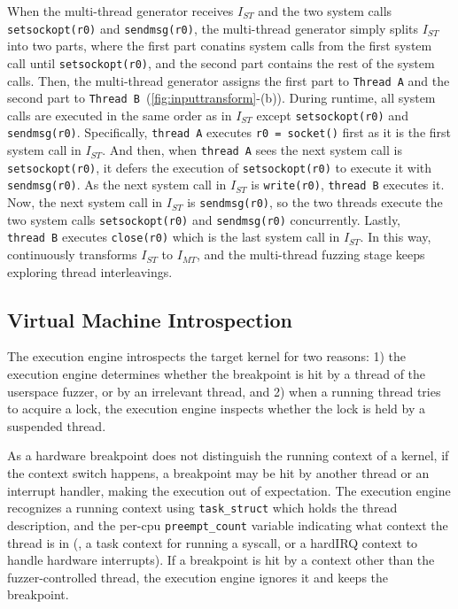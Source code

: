 When the multi-thread generator receives $I_{ST}$ and the two system
calls \texttt{setsockopt(r0)} and \texttt{sendmsg(r0)}, the
multi-thread generator simply splits $I_{ST}$ into two parts, where
the first part conatins system calls from the first system call until
\texttt{setsockopt(r0)}, and the second part contains the rest of the
system calls. Then, the multi-thread generator assigns the first part
to \texttt{Thread~A} and the second part to
\texttt{Thread~B}~(\autoref{fig:inputtransform}-(b)).
%
During runtime, all system calls are executed in the same order as in
$I_{ST}$ except \texttt{setsockopt(r0)} and \texttt{sendmsg(r0)}.
%
Specifically, \texttt{thread~A} executes \texttt{r0 = socket()} first
as it is the first system call in $I_{ST}$. And then, when
\texttt{thread~A} sees the next system call is
\texttt{setsockopt(r0)}, it defers the execution of
\texttt{setsockopt(r0)} to execute it with \texttt{sendmsg(r0)}.
%
As the next system call in $I_{ST}$ is \texttt{write(r0)},
\texttt{thread~B} executes it. Now, the next system call in $I_{ST}$
is \texttt{sendmsg(r0)}, so the two threads execute the two system
calls \texttt{setsockopt(r0)} and \texttt{sendmsg(r0)} concurrently.
%
Lastly, \texttt{thread~B} executes \texttt{close(r0)} which is the
last system call in $I_{ST}$.
%
In this way, \sys continuously transforms $I_{ST}$ to $I_{MT}$, and
the multi-thread fuzzing stage keeps exploring thread interleavings.

\subsection{Virtual Machine Introspection}
\label{s:appendix:vmi}

The execution engine introspects the target kernel for two reasons: 1)
the execution engine determines whether the breakpoint is hit by a
thread of the userspace fuzzer, or by an irrelevant thread, and 2)
when a running thread tries to acquire a lock, the execution engine
inspects whether the lock is held by a suspended thread.

As a hardware breakpoint does not distinguish the running context of a
kernel, if the context switch happens, a breakpoint may be hit by
another thread or an interrupt handler, making the execution out of
expectation.
%
The execution engine recognizes a running context using
\texttt{task_struct} which holds the thread description, and the
per-cpu \texttt{preempt_count} variable indicating what context the
thread is in (\eg, a task context for running a syscall, or a hardIRQ
context to handle hardware interrupts).
%
If a breakpoint is hit by a context other than the fuzzer-controlled
thread, the execution engine ignores it and keeps the breakpoint.


